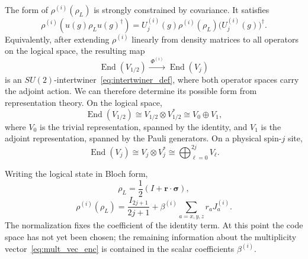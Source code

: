 \documentclass[10pt,twocolumn,superscriptaddress,aps,amsmath,amssymb,citeautoscript,floatfix,prx,longbibliography]{revtex4-2}
\theoremstyle{plain}
\theoremstyle{plain}
\theoremstyle{plain}
\theoremstyle{plain}
\theoremstyle{plain}
\theoremstyle{plain}
\begin{document}
The form of $\rho^{(i)}(\rho_L)$ is strongly constrained by covariance. It satisfies
\begin{equation}\label{eq:reduced-state_cov_cond}
    \rho^{(i)}\!\left(u(g)\rho_Lu(g)^\dagger\right)
    =
    U_j^{(i)}(g)\rho^{(i)}(\rho_L)\bigl(U_j^{(i)}(g)\bigr)^\dagger .
\end{equation}
Equivalently, after extending $\rho^{(i)}$ linearly from density matrices to all operators on the logical space, the resulting map
\[
    \operatorname{End}(V_{1/2})
    \xrightarrow{\;\Phi^{(i)}\;}
    \operatorname{End}(V_j)
\]
is an $SU(2)$-intertwiner~\eqref{eq:intertwiner_def}, where both operator spaces carry the adjoint action. We can therefore determine its possible form from representation theory. On the logical space,
\[
    \operatorname{End}(V_{1/2})
    \cong
    V_{1/2}\otimes V_{1/2}^*
    \cong
    V_0\oplus V_1,
\]
where $V_0$ is the trivial representation, spanned by the identity, and $V_1$ is the adjoint representation, spanned by the Pauli generators. On a physical spin-$j$ site,
\[
    \operatorname{End}(V_j)
    \cong
    V_j\otimes V_j^*
    \cong
    \bigoplus_{\ell=0}^{2j} V_\ell .
\]

Writing the logical state in Bloch form,
\[
    \rho_L=\frac12(I+\mathbf r\cdot\boldsymbol\sigma),
\]
\begin{equation}\label{eq:reduced_state_beta}
    \rho^{(i)}(\rho_L)
    =
    \frac{I_{2j+1}}{2j+1}
    +
    \beta^{(i)}
    \sum_{a=x,y,z} r_a J_a^{(i)} .
\end{equation}
The normalization fixes the coefficient of the identity term. At this point the code space has not yet been chosen; the remaining information about the multiplicity vector~\eqref{eq:mult_vec_enc} is contained in the scalar coefficients $\beta^{(i)}$.
\end{document}

